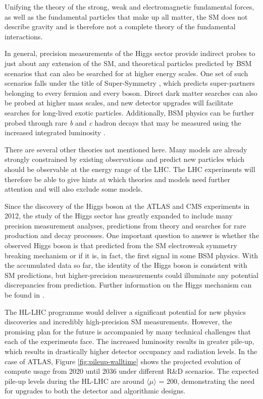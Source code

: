 Unifying the theory of the strong, weak and electromagnetic fundamental forces, as well as the fundamental particles that make up all matter, the SM does not describe gravity and is therefore not a complete theory of the fundamental interactions.


In general, precision measurements of the Higgs sector provide indirect probes to just about any extension of the SM, and theoretical particles predicted by BSM scenarios that can also be searched for at higher energy scales. One set of such scenarios falls under the title of Super-Symmetry \cite{supersym}, which predicts super-partners belonging to every fermion and every boson. Direct dark matter searches can also be probed at higher mass scales, and new detector upgrades will facilitate searches for long-lived exotic particles. Additionally, BSM physics can be further probed through rare \textit{b} and \textit{c} hadron decays that may be measured using the increased integrated luminosity \cite{wg-bsm}.

There are several other theories not mentioned here. Many models are already strongly constrained by existing observations and predict new particles which should be observable at the energy range of the LHC. The LHC experiments will therefore be able to give hints at which theories and models need further attention and will also exclude some models.


Since the discovery of the Higgs boson at the ATLAS and CMS experiments \cite{ATLAS-HIGGS, CMS-HIGGS} in 2012, the study of the Higgs sector has greatly expanded to include many precision measurement analyses, predictions from theory and searches for rare production and decay processes. One important question to answer is whether the observed Higgs boson is that predicted from the SM electroweak symmetry breaking mechanism \cite{ewsb} or if it is, in fact, the first signal in some BSM physics. With the accumulated data so far, the identity of the Higgs boson is consistent with SM predictions, but higher-precision measurements could illuminate any potential discrepancies from prediction. Further information on the Higgs mechanism can be found in \cite{Bednyakov_2008}.



The HL-LHC programme would deliver a significant potential for new physics discoveries and incredibly high-precision SM measurements. However, the promising plan for the future is accompanied by many technical challenges that each of the experiments face. The increased luminosity results in greater pile-up, which results in drastically higher detector occupancy and radiation levels. In the case of ATLAS, Figure \ref{fig:pileup-walltime} shows the projected evolution of compute usage from 2020 until 2036 under different R\&D scenarios. The expected pile-up levels during the HL-LHC are around $\langle \mu \rangle$ = 200, demonstrating the need for upgrades to both the detector and algorithmic designs.


